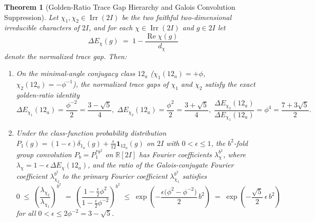 \documentclass[11pt,a4paper]{article}
\newtheorem{theorem}{Theorem}[section]
\theoremstyle{definition}
\theoremstyle{remark}
\newcommand{\R}{\mathbb{R}}
\newcommand{\Irr}{\operatorname{Irr}}
\begin{document}
\begin{theorem}[Golden-Ratio Trace Gap Hierarchy and Galois Convolution Suppression]
\label{thm:galois_suppression}
Let $\chi_1, \chi_2 \in \Irr(2I)$ be the two faithful two-dimensional irreducible characters of $2I$, and for each $\chi \in \Irr(2I)$ and $g \in 2I$ let
\begin{equation}
\label{eq:trace_gap_def}
\Delta E_\chi(g) \;=\; 1 - \frac{\operatorname{Re}\chi(g)}{d_\chi}
\end{equation}
denote the normalized trace gap. Then:
\begin{enumerate}
    \item On the minimal-angle conjugacy class $12_a$ ($\chi_1(12_a) = +\phi$, $\chi_2(12_a) = -\phi^{-1}$), the normalized trace gaps of $\chi_1$ and $\chi_2$ satisfy the exact golden-ratio identity
    \begin{equation}
    \label{eq:phi4_ratio}
    \Delta E_{\chi_1}(12_a) = \frac{\phi^{-2}}{2} = \frac{3 - \sqrt{5}}{4}, \;
    \Delta E_{\chi_2}(12_a) = \frac{\phi^2}{2} = \frac{3 + \sqrt{5}}{4}, \;
    \frac{\Delta E_{\chi_2}(12_a)}{\Delta E_{\chi_1}(12_a)} = \phi^4 = \frac{7 + 3\sqrt{5}}{2}.
    \end{equation}
    \item Under the class-function probability distribution $P_1(g) = (1 - \epsilon)\delta_{1_a}(g) + \frac{\epsilon}{12}\mathbf{1}_{12_a}(g)$ on $2I$ with $0 < \epsilon \le 1$, the $b^2$-fold group convolution $P_b = P_1^{* b^2}$ on $\R[2I]$ has Fourier coefficients $\lambda_\chi^{b^2}$, where $\lambda_\chi = 1 - \epsilon\,\Delta E_\chi(12_a)$, and the ratio of the Galois-conjugate Fourier coefficient $\lambda_{\chi_2}^{b^2}$ to the primary Fourier coefficient $\lambda_{\chi_1}^{b^2}$ satisfies
    \begin{equation}
    \label{eq:galois_decay_bound}
    0 \;\le\; \left(\frac{\lambda_{\chi_2}}{\lambda_{\chi_1}}\right)^{b^2} \;=\; \left(\frac{1 - \frac{\epsilon}{2}\phi^2}{1 - \frac{\epsilon}{2}\phi^{-2}}\right)^{b^2} \;\le\; \exp\!\left(-\frac{\epsilon\bigl(\phi^2 - \phi^{-2}\bigr)}{2}\,b^2\right) \;=\; \exp\!\left(-\frac{\sqrt{5}}{2}\,\epsilon\,b^2\right)
    \end{equation}
    for all $0 < \epsilon \le 2\phi^{-2} = 3 - \sqrt{5}$.
\end{enumerate}
\end{theorem}
\end{document}
